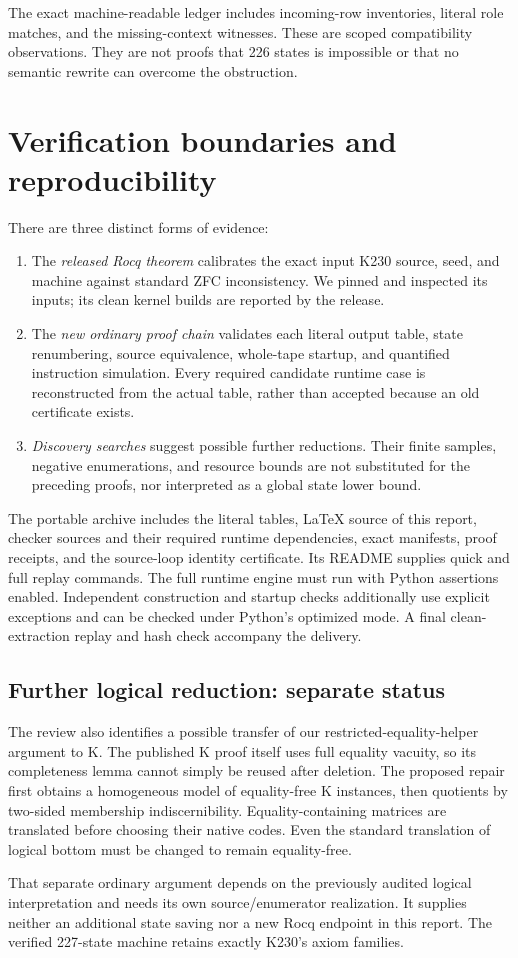 The exact machine-readable ledger includes incoming-row inventories, literal
role matches, and the missing-context witnesses. These are scoped compatibility
observations. They are not proofs that 226 states is impossible or that no
semantic rewrite can overcome the obstruction.

\section{Verification boundaries and reproducibility}
There are three distinct forms of evidence:
\begin{enumerate}
\item The \emph{released Rocq theorem} calibrates the exact input K230 source,
seed, and machine against standard ZFC inconsistency. We pinned and inspected
its inputs; its clean kernel builds are reported by the release.
\item The \emph{new ordinary proof chain} validates each literal output table,
state renumbering, source equivalence, whole-tape startup, and quantified
instruction simulation. Every required candidate runtime case is reconstructed
from the actual table, rather than accepted because an old certificate exists.
\item \emph{Discovery searches} suggest possible further reductions. Their
finite samples, negative enumerations, and resource bounds are not substituted
for the preceding proofs, nor interpreted as a global state lower bound.
\end{enumerate}
The portable archive includes the literal tables, LaTeX source of this report,
checker sources and their required runtime dependencies, exact manifests,
proof receipts, and the source-loop identity certificate. Its README supplies
quick and full replay commands. The full runtime engine must run with Python
assertions enabled. Independent construction and startup checks additionally
use explicit exceptions and can be checked under Python's optimized mode.
A final clean-extraction replay and hash check accompany the delivery.

\subsection{Further logical reduction: separate status}
The review also identifies a possible transfer of our restricted-equality-helper
argument to K. The published K proof itself uses full equality vacuity, so its
completeness lemma cannot simply be reused after deletion. The proposed repair
first obtains a homogeneous model of equality-free K instances, then quotients
by two-sided membership indiscernibility. Equality-containing matrices are
translated before choosing their native codes. Even the standard translation
of logical bottom must be changed to remain equality-free.

That separate ordinary argument depends on the previously audited logical
interpretation and needs its own source/enumerator realization. It supplies
neither an additional state saving nor a new Rocq endpoint in this report.
The verified 227-state machine retains exactly K230's axiom families.
